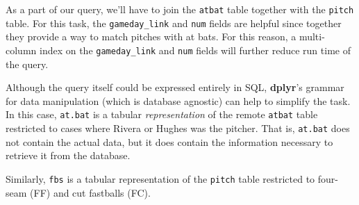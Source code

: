 \documentclass[12pt,]{isuthesis}
\newenvironment{Shaded}{\begin{snugshade}}{\end{snugshade}}
\newcommand{\KeywordTok}[1]{\textcolor[rgb]{0.13,0.29,0.53}{\textbf{{#1}}}}
\newcommand{\StringTok}[1]{\textcolor[rgb]{0.31,0.60,0.02}{{#1}}}
\newcommand{\NormalTok}[1]{{#1}}
\begin{document}
As a part of our query, we'll have to join the \texttt{atbat} table
together with the \texttt{pitch} table. For this task, the
\texttt{gameday\_link} and \texttt{num} fields are helpful since
together they provide a way to match pitches with at bats. For this
reason, a multi-column index on the \texttt{gameday\_link} and
\texttt{num} fields will further reduce run time of the query.

\begin{Shaded}
\end{Shaded}

Although the query itself could be expressed entirely in SQL,
\textbf{dplyr}'s grammar for data manipulation (which is database
agnostic) can help to simplify the task. In this case, \texttt{at.bat}
is a tabular \emph{representation} of the remote \texttt{atbat} table
restricted to cases where Rivera or Hughes was the pitcher. That is,
\texttt{at.bat} does not contain the actual data, but it does contain
the information necessary to retrieve it from the database.

\begin{Shaded}
\end{Shaded}

Similarly, \texttt{fbs} is a tabular representation of the
\texttt{pitch} table restricted to four-seam (FF) and cut fastballs
(FC).

\begin{Shaded}
\end{Shaded}
\end{document}
